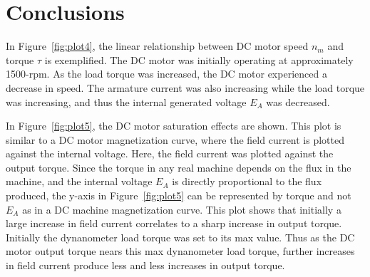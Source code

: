 \documentclass{article}
\begin{document}
\section*{Conclusions}

In Figure~\ref{fig:plot4}, the linear relationship between DC motor speed $n_m$
and torque $\tau$ is exemplified.  The DC motor was initially operating at
approximately 1500-rpm.  As the load torque was increased, the DC motor
experienced a decrease in speed.  The armature current was also increasing
while the load torque was increasing, and thus the internal generated voltage
$E_A$ was decreased.

In Figure~\ref{fig:plot5}, the DC motor saturation effects are shown.  This
plot is similar to a DC motor magnetization curve, where the field current is
plotted against the internal voltage.  Here, the field current was plotted
against the output torque.  Since the torque in any real machine depends on the
flux in the machine, and the internal voltage $E_A$ is directly proportional to
the flux produced, the y-axis in Figure~\ref{fig:plot5} can be represented by
torque and not $E_A$ as in a DC machine magnetization curve.  This plot shows
that initially a large increase in field current correlates to a sharp increase
in output torque.  Initially the dynanometer load torque was set to its max
value.  Thus as the DC motor output torque nears this max dynanometer load
torque, further increases in field current produce less and less increases in
output torque.
\end{document}
